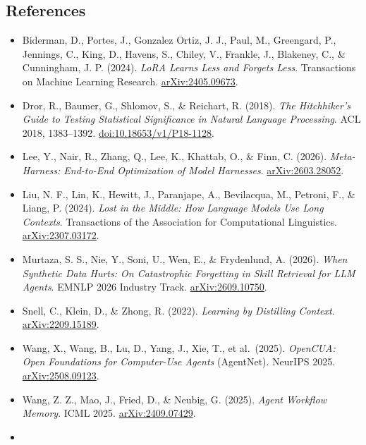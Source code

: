 \documentclass[
  10pt,
]{article}
\providecommand{\tightlist}{%
  \setlength{\itemsep}{0pt}\setlength{\parskip}{0pt}}
\begin{document}
\small

\subsection{References}\label{references}

\begin{itemize}
\tightlist
\item
  Biderman, D., Portes, J., Gonzalez Ortiz, J. J., Paul, M., Greengard,
  P., Jennings, C., King, D., Havens, S., Chiley, V., Frankle, J.,
  Blakeney, C., \& Cunningham, J. P. (2024). \emph{LoRA Learns Less and
  Forgets Less}. Transactions on Machine Learning Research.
  \href{https://arxiv.org/abs/2405.09673}{arXiv:2405.09673}.
\item
  Dror, R., Baumer, G., Shlomov, S., \& Reichart, R. (2018). \emph{The
  Hitchhiker's Guide to Testing Statistical Significance in Natural
  Language Processing}. ACL 2018, 1383--1392.
  \href{https://aclanthology.org/P18-1128/}{doi:10.18653/v1/P18-1128}.
\item
  Lee, Y., Nair, R., Zhang, Q., Lee, K., Khattab, O., \& Finn, C.
  (2026). \emph{Meta-Harness: End-to-End Optimization of Model
  Harnesses}. \href{https://arxiv.org/abs/2603.28052}{arXiv:2603.28052}.
\item
  Liu, N. F., Lin, K., Hewitt, J., Paranjape, A., Bevilacqua, M.,
  Petroni, F., \& Liang, P. (2024). \emph{Lost in the Middle: How
  Language Models Use Long Contexts}. Transactions of the Association
  for Computational Linguistics.
  \href{https://arxiv.org/abs/2307.03172}{arXiv:2307.03172}.
\item
  Murtaza, S. S., Nie, Y., Soni, U., Wen, E., \& Frydenlund, A. (2026).
  \emph{When Synthetic Data Hurts: On Catastrophic Forgetting in Skill
  Retrieval for LLM Agents}. EMNLP 2026 Industry Track.
  \href{https://arxiv.org/abs/2609.10750}{arXiv:2609.10750}.
\item
  Snell, C., Klein, D., \& Zhong, R. (2022). \emph{Learning by
  Distilling Context}.
  \href{https://arxiv.org/abs/2209.15189}{arXiv:2209.15189}.
\item
  Wang, X., Wang, B., Lu, D., Yang, J., Xie, T., et al.~(2025).
  \emph{OpenCUA: Open Foundations for Computer-Use Agents} (AgentNet).
  NeurIPS 2025.
  \href{https://arxiv.org/abs/2508.09123}{arXiv:2508.09123}.
\item
  Wang, Z. Z., Mao, J., Fried, D., \& Neubig, G. (2025). \emph{Agent
  Workflow Memory}. ICML 2025.
  \href{https://arxiv.org/abs/2409.07429}{arXiv:2409.07429}.
\item

\end{itemize}
\end{document}
